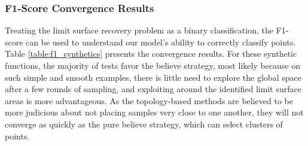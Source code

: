 \subsubsection{F1-Score Convergence Results}
Treating the limit surface recovery problem as a binary classification, the F1-score can be used to understand our model's ability to correctly classify points.
%
Table \ref{table:f1_synthetics} presents the convergence results.
For these synthetic functions, the majority of tests favor the believe strategy, most likely because on such simple and smooth examples, there is little need to explore the global space after a few rounds of sampling, and exploiting around the identified limit surface areas is more advantageous.
%
As the topology-based methods are believed to be more judicious about not placing samples very close to one another, they will not converge as quickly as the pure believe strategy, which can select clusters of points.

